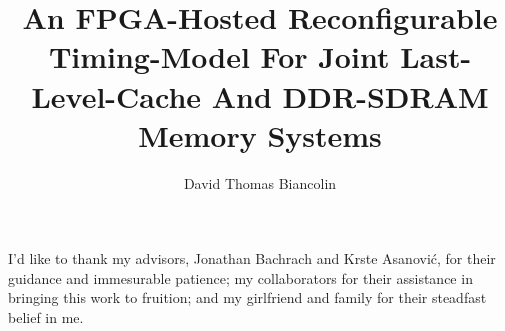 \documentclass[masters]{ucbthesis}
\begin{document}

\title{An FPGA-Hosted Reconfigurable Timing-Model For Joint Last-Level-Cache And DDR-SDRAM Memory Systems}
\author{David Thomas Biancolin}


\clearpage

\maketitle

%

\begin{frontmatter}


\setcounter{tocdepth}{2}
\setcounter{secnumdepth}{2}
\tableofcontents
\clearpage
\listoffigures
\clearpage
\listoftables

    \begin{acknowledgements}

I'd like to thank my advisors, Jonathan Bachrach and Krste Asanovi\'c, for
their guidance and immesurable patience; my collaborators for their assistance in
bringing this work to fruition; and my girlfriend and family for their steadfast belief in me.

    \end{acknowledgements}
\end{frontmatter}
\end{document}
